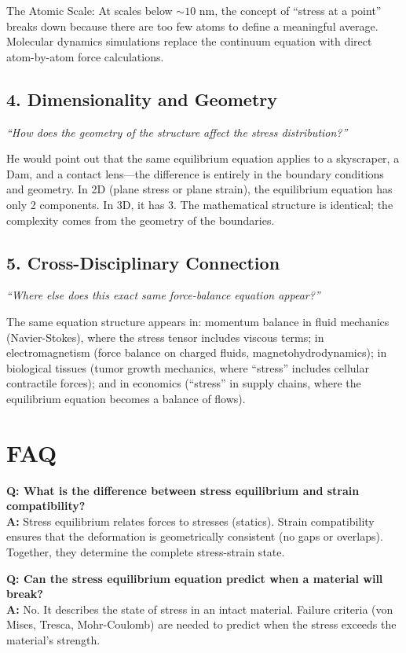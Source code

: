 The Atomic Scale: At scales below $\sim 10$ nm, the concept of ``stress at a point'' breaks down because there are too few atoms to define a meaningful average. Molecular dynamics simulations replace the continuum equation with direct atom-by-atom force calculations.

\subsection*{4. Dimensionality and Geometry}
\textit{``How does the geometry of the structure affect the stress distribution?''}

He would point out that the same equilibrium equation applies to a skyscraper, a Dam, and a contact lens---the difference is entirely in the boundary conditions and geometry. In 2D (plane stress or plane strain), the equilibrium equation has only 2 components. In 3D, it has 3. The mathematical structure is identical; the complexity comes from the geometry of the boundaries.

\subsection*{5. Cross-Disciplinary Connection}
\textit{``Where else does this exact same force-balance equation appear?''}

The same equation structure appears in: momentum balance in fluid mechanics (Navier-Stokes), where the stress tensor includes viscous terms; in electromagnetism (force balance on charged fluids, magnetohydrodynamics); in biological tissues (tumor growth mechanics, where ``stress'' includes cellular contractile forces); and in economics (``stress'' in supply chains, where the equilibrium equation becomes a balance of flows).
\section*{FAQ}

\textbf{Q: What is the difference between stress equilibrium and strain compatibility?}\\
\textbf{A:} Stress equilibrium relates forces to stresses (statics). Strain compatibility ensures that the deformation is geometrically consistent (no gaps or overlaps). Together, they determine the complete stress-strain state.

\textbf{Q: Can the stress equilibrium equation predict when a material will break?}\\
\textbf{A:} No. It describes the state of stress in an intact material. Failure criteria (von Mises, Tresca, Mohr-Coulomb) are needed to predict when the stress exceeds the material's strength.

